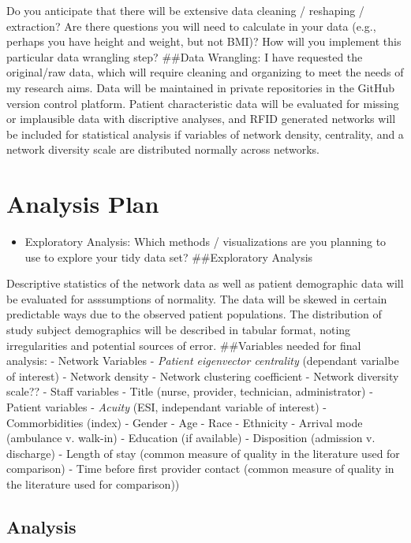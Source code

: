 \documentclass[]{elsarticle} %
\providecommand{\tightlist}{%
  \setlength{\itemsep}{0pt}\setlength{\parskip}{0pt}}
\begin{document}
Do you anticipate that there will be extensive data cleaning / reshaping
/ extraction? Are there questions you will need to calculate in your
data (e.g., perhaps you have height and weight, but not BMI)? How will
you implement this particular data wrangling step? \#\#Data Wrangling: I
have requested the original/raw data, which will require cleaning and
organizing to meet the needs of my research aims. Data will be
maintained in private repositories in the GitHub version control
platform. Patient characteristic data will be evaluated for missing or
implausible data with discriptive analyses, and RFID generated networks
will be included for statistical analysis if variables of network
density, centrality, and a network diversity scale are distributed
normally across networks.

\section{Analysis Plan}\label{analysis-plan}

\begin{itemize}
\tightlist
\item
  Exploratory Analysis: Which methods / visualizations are you planning
  to use to explore your tidy data set? \#\#Exploratory Analysis
\end{itemize}

Descriptive statistics of the network data as well as patient
demographic data will be evaluated for asssumptions of normality. The
data will be skewed in certain predictable ways due to the observed
patient populations. The distribution of study subject demographics will
be described in tabular format, noting irregularities and potential
sources of error. \#\#Variables needed for final analysis: - Network
Variables - \emph{Patient eigenvector centrality} (dependant varialbe of
interest) - Network density - Network clustering coefficient - Network
diversity scale?? - Staff variables - Title (nurse, provider,
technician, administrator) - Patient variables - \emph{Acuity} (ESI,
independant variable of interest) - Commorbidities (index) - Gender -
Age - Race - Ethnicity - Arrival mode (ambulance v. walk-in) - Education
(if available) - Disposition (admission v. discharge) - Length of stay
(common measure of quality in the literature used for comparison) - Time
before first provider contact (common measure of quality in the
literature used for comparison))

\subsection{Analysis}\label{analysis}
\end{document}
